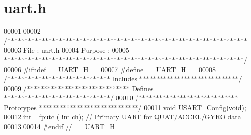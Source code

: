 \section{uart.\+h}
\label{uart_8h_source}

\begin{DoxyCode}
00001 
00002 \textcolor{comment}{/**********************************************************************}
00003 \textcolor{comment}{File    : uart.h}
00004 \textcolor{comment}{Purpose : }
00005 \textcolor{comment}{**********************************************************************/}
00006 \textcolor{preprocessor}{#}\textcolor{preprocessor}{ifndef} \textcolor{preprocessor}{\_\_UART\_H\_\_}
00007 \textcolor{preprocessor}{#}\textcolor{preprocessor}{define} \textcolor{preprocessor}{\_\_UART\_H\_\_}
00008 \textcolor{comment}{/****************************** Includes *****************************/}
00009 \textcolor{comment}{/****************************** Defines *******************************/}
00010 \textcolor{comment}{/***************************** Prototypes *****************************/}
00011 \textcolor{keywordtype}{void} USART_Config(\textcolor{keywordtype}{void});
00012 \textcolor{keywordtype}{int} _fputc ( \textcolor{keywordtype}{int} ch);      \textcolor{comment}{// Primary UART for QUAT/ACCEL/GYRO data}
00013 
00014 \textcolor{preprocessor}{#}\textcolor{preprocessor}{endif} \textcolor{comment}{// \_\_UART\_H\_\_}
\end{DoxyCode}
